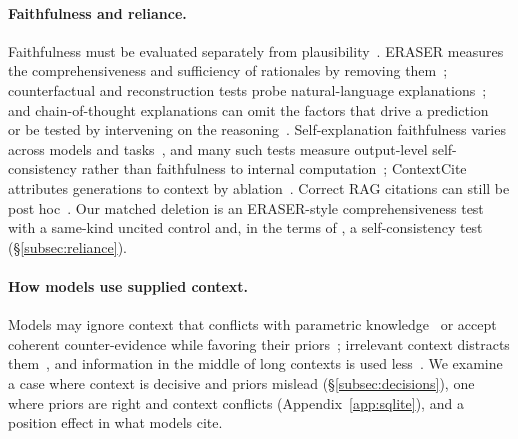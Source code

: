 \paragraph{Faithfulness and reliance.}
Faithfulness must be evaluated separately from plausibility~\cite{Jacovi2020Faithfulness}. ERASER measures the comprehensiveness and sufficiency of rationales by removing them~\cite{DeYoung2020ERASER}; counterfactual and reconstruction tests probe natural-language explanations~\cite{Atanasova2023FaithfulnessTests}; and chain-of-thought explanations can omit the factors that drive a prediction~\cite{Turpin2023Unfaithful} or be tested by intervening on the reasoning~\cite{Lanham2023CoTFaithfulness}. Self-explanation faithfulness varies across models and tasks~\cite{Madsen2024SelfExplanations}, and many such tests measure output-level self-consistency rather than faithfulness to internal computation~\cite{Parcalabescu2024SelfConsistency}; ContextCite attributes generations to context by ablation~\cite{CohenWang2024ContextCite}. Correct RAG citations can still be post hoc~\cite{Wallat2025Correctness}. Our matched deletion is an ERASER-style comprehensiveness test with a same-kind uncited control and, in the terms of \citet{Parcalabescu2024SelfConsistency}, a self-consistency test (\S\ref{subsec:reliance}).

\paragraph{How models use supplied context.}
Models may ignore context that conflicts with parametric knowledge~\cite{Longpre2021KnowledgeConflicts} or accept coherent counter-evidence while favoring their priors~\cite{Xie2024ChameleonSloth}; irrelevant context distracts them~\cite{Shi2023Distracted}, and information in the middle of long contexts is used less~\cite{Liu2024LostMiddle}. We examine a case where context is decisive and priors mislead (\S\ref{subsec:decisions}), one where priors are right and context conflicts (Appendix~\ref{app:sqlite}), and a position effect in what models cite.

